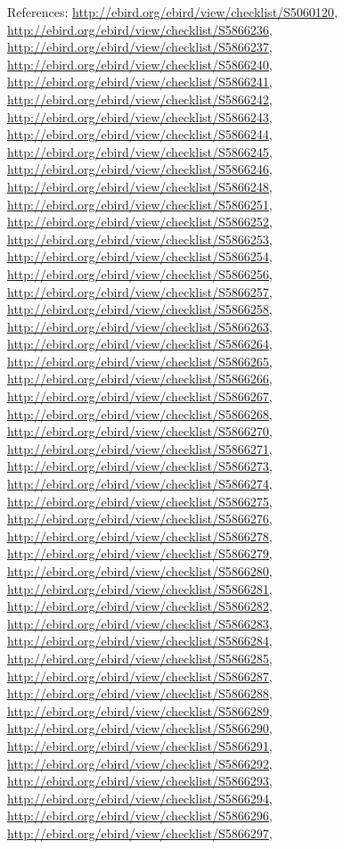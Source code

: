 \documentclass[9pt, article]{memoir}
\begin{document}
\begin{multicols}{2}
References: 
\url{http://ebird.org/ebird/view/checklist/S5060120}, 
\url{http://ebird.org/ebird/view/checklist/S5866236}, 
\url{http://ebird.org/ebird/view/checklist/S5866237}, 
\url{http://ebird.org/ebird/view/checklist/S5866240}, 
\url{http://ebird.org/ebird/view/checklist/S5866241}, 
\url{http://ebird.org/ebird/view/checklist/S5866242}, 
\url{http://ebird.org/ebird/view/checklist/S5866243}, 
\url{http://ebird.org/ebird/view/checklist/S5866244}, 
\url{http://ebird.org/ebird/view/checklist/S5866245}, 
\url{http://ebird.org/ebird/view/checklist/S5866246}, 
\url{http://ebird.org/ebird/view/checklist/S5866248}, 
\url{http://ebird.org/ebird/view/checklist/S5866251}, 
\url{http://ebird.org/ebird/view/checklist/S5866252}, 
\url{http://ebird.org/ebird/view/checklist/S5866253}, 
\url{http://ebird.org/ebird/view/checklist/S5866254}, 
\url{http://ebird.org/ebird/view/checklist/S5866256}, 
\url{http://ebird.org/ebird/view/checklist/S5866257}, 
\url{http://ebird.org/ebird/view/checklist/S5866258}, 
\url{http://ebird.org/ebird/view/checklist/S5866263}, 
\url{http://ebird.org/ebird/view/checklist/S5866264}, 
\url{http://ebird.org/ebird/view/checklist/S5866265}, 
\url{http://ebird.org/ebird/view/checklist/S5866266}, 
\url{http://ebird.org/ebird/view/checklist/S5866267}, 
\url{http://ebird.org/ebird/view/checklist/S5866268}, 
\url{http://ebird.org/ebird/view/checklist/S5866270}, 
\url{http://ebird.org/ebird/view/checklist/S5866271}, 
\url{http://ebird.org/ebird/view/checklist/S5866273}, 
\url{http://ebird.org/ebird/view/checklist/S5866274}, 
\url{http://ebird.org/ebird/view/checklist/S5866275}, 
\url{http://ebird.org/ebird/view/checklist/S5866276}, 
\url{http://ebird.org/ebird/view/checklist/S5866278}, 
\url{http://ebird.org/ebird/view/checklist/S5866279}, 
\url{http://ebird.org/ebird/view/checklist/S5866280}, 
\url{http://ebird.org/ebird/view/checklist/S5866281}, 
\url{http://ebird.org/ebird/view/checklist/S5866282}, 
\url{http://ebird.org/ebird/view/checklist/S5866283}, 
\url{http://ebird.org/ebird/view/checklist/S5866284}, 
\url{http://ebird.org/ebird/view/checklist/S5866285}, 
\url{http://ebird.org/ebird/view/checklist/S5866287}, 
\url{http://ebird.org/ebird/view/checklist/S5866288}, 
\url{http://ebird.org/ebird/view/checklist/S5866289}, 
\url{http://ebird.org/ebird/view/checklist/S5866290}, 
\url{http://ebird.org/ebird/view/checklist/S5866291}, 
\url{http://ebird.org/ebird/view/checklist/S5866292}, 
\url{http://ebird.org/ebird/view/checklist/S5866293}, 
\url{http://ebird.org/ebird/view/checklist/S5866294}, 
\url{http://ebird.org/ebird/view/checklist/S5866296}, 
\url{http://ebird.org/ebird/view/checklist/S5866297}, 

\end{multicols}
\end{document}
